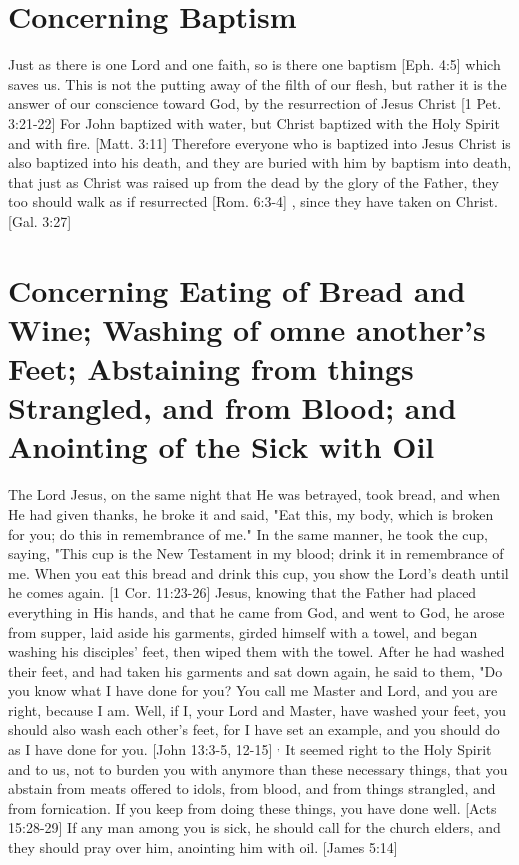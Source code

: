 \documentclass[../main.tex] {subfiles}
\begin{document}
	\section{Concerning Baptism}

	Just as there is one Lord and one faith, so is there one baptism [Eph. 4:5]  which saves us. This is not the putting away of the filth of our flesh, but rather it is the answer of our conscience toward God, by the resurrection of Jesus Christ [1 Pet. 3:21-22]  For John baptized with water, but Christ baptized with the Holy Spirit and with fire. [Matt. 3:11]  Therefore everyone who is baptized into Jesus Christ is also baptized into his death, and they are buried with him by baptism into death, that just as Christ was raised up from the dead by the glory of the Father, they too should walk as if resurrected [Rom. 6:3-4] , since they have taken on Christ. [Gal. 3:27] 

	\section{Concerning Eating of Bread and Wine; Washing of omne another's Feet; Abstaining from things Strangled, and from Blood; and Anointing of the Sick with Oil}

	The Lord Jesus, on the same night that He was betrayed, took bread, and when He had given thanks, he broke it and said, "Eat this, my body, which is broken for you; do this in remembrance of me." In the same manner, he took the cup, saying, "This cup is the New Testament in my blood; drink it in remembrance of me. When you eat this bread and drink this cup, you show the Lord's death until he comes again. [1 Cor. 11:23-26]  Jesus, knowing that the Father had placed everything in His hands, and that he came from God, and went to God, he arose from supper, laid aside his garments, girded himself with a towel, and began washing his disciples' feet, then wiped them with the towel. After he had washed their feet, and had taken his garments and sat down again, he said to them, "Do you know what I have done for you?  You call me Master and Lord, and you are right, because I am. Well, if I, your Lord and Master, have washed your feet, you should also wash each other's feet, for I have set an example, and you should do as I have done for you. [John 13:3-5, 12-15] $^{,}$ It seemed right to the Holy Spirit and to us, not to burden you with anymore than these necessary things, that you abstain from meats offered to idols, from blood, and from things strangled, and from fornication. If you keep from doing these things, you have done well. [Acts 15:28-29]  If any man among you is sick, he should call for the church elders, and they should pray over him, anointing him with oil. [James 5:14] 
\end{document}
